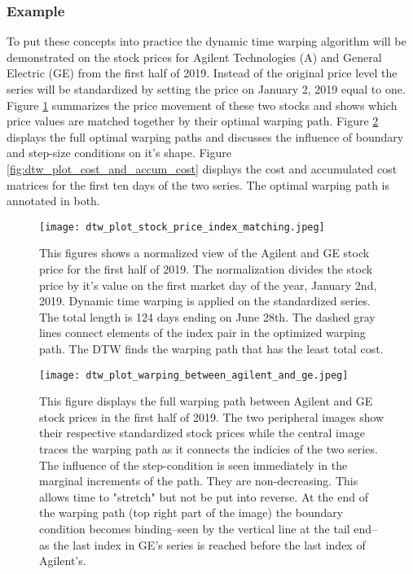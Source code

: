 \documentclass[12pt]{article}
\begin{document}
\subsubsection{Example}

To put these concepts into practice the dynamic time warping algorithm will be demonstrated on the stock prices for Agilent Technologies (A) and General Electric (GE) from the first half of 2019. Instead of the original price level the series will be standardized by setting the price on January 2, 2019 equal to one. Figure \ref{fig:dtw_plot_stock_price_index_matching} summarizes the price movement of these two stocks and shows which price values are matched together by their optimal warping path. Figure \ref{fig:dtw_plot_warping_between_agilent_and_ge} displays the full optimal warping paths and discusses the influence of boundary and step-size conditions on it's shape. Figure \ref{fig:dtw_plot_cost_and_accum_cost} displays the cost and accumulated cost matrices for the first ten days of the two series. The optimal warping path is annotated in both.

\begin{figure}
    \centering
    \texttt{[image: dtw\_plot\_stock\_price\_index\_matching.jpeg]}
    \caption{This figures shows a normalized view of the Agilent and GE stock price for the first half of 2019. The normalization divides the stock price by it's value on the first market day of the year, January 2nd, 2019. Dynamic time warping is applied on the standardized series. The total length is 124 days ending on June 28th. The dashed gray lines connect elements of the index pair in the optimized warping path. The DTW finds the warping path that has the least total cost.}
    \label{fig:dtw_plot_stock_price_index_matching}
\end{figure}

\begin{figure}
    \centering
    \texttt{[image: dtw\_plot\_warping\_between\_agilent\_and\_ge.jpeg]}
    \caption{This figure displays the full warping path between Agilent and GE stock prices in the first half of 2019. The two peripheral images show their respective standardized stock prices while the central image traces the warping path as it connects the indicies of the two series. The influence of the step-condition is seen immediately in the marginal increments of the path. They are non-decreasing. This allows time to "stretch" but not be put into reverse. At the end of the warping path (top right part of the image) the boundary condition becomes binding--seen by the vertical line at the tail end--as the last index in GE's series is reached before the last index of Agilent's.}
    \label{fig:dtw_plot_warping_between_agilent_and_ge}
\end{figure}
\end{document}
